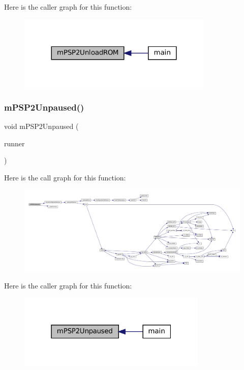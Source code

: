 Here is the caller graph for this function\+:
\nopagebreak
\begin{figure}[H]
\begin{center}
\leavevmode
\includegraphics[width=264pt]{psp2-context_8h_a94ad5d2964da6bad167ee85e5f021421_icgraph}
\end{center}
\end{figure}
\mbox{\label{psp2-context_8h_a02416ce4a85e3b948b2a1df34d901cb3}} 
\subsubsection{\texorpdfstring{m\+P\+S\+P2\+Unpaused()}{mPSP2Unpaused()}}
{\footnotesize\ttfamily void m\+P\+S\+P2\+Unpaused (\begin{DoxyParamCaption}\item[{struct \mbox{\hyperlink{structm_g_u_i_runner}{m\+G\+U\+I\+Runner}} $\ast$}]{runner }\end{DoxyParamCaption})}

Here is the call graph for this function\+:
\nopagebreak
\begin{figure}[H]
\begin{center}
\leavevmode
\includegraphics[width=350pt]{psp2-context_8h_a02416ce4a85e3b948b2a1df34d901cb3_cgraph}
\end{center}
\end{figure}
Here is the caller graph for this function\+:
\nopagebreak
\begin{figure}[H]
\begin{center}
\leavevmode
\includegraphics[width=256pt]{psp2-context_8h_a02416ce4a85e3b948b2a1df34d901cb3_icgraph}
\end{center}
\end{figure}
